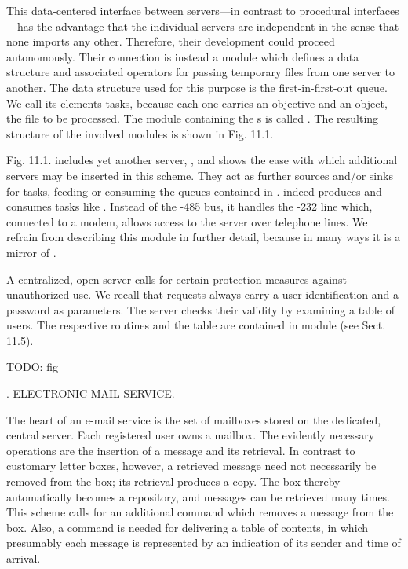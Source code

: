 This data-centered interface between servers---in contrast to procedural inter\-faces---has the advantage that the individual servers are independent in the sense that none imports any other. Therefore, their development could proceed autonomously. Their connection is instead a module which defines a data structure and associated operators for passing temporary files from one server to another. The data structure used for this purpose is the first-in-first-out queue. We call its elements tasks, because each one carries an objective and an object, the file to be processed. The module containing the s is called . The resulting structure of the involved modules is shown in Fig. 11.1.

Fig. 11.1. includes yet another server, , and shows the ease with which additional servers may be inserted in this scheme. They act as further sources and/or sinks for tasks, feeding or consuming the queues contained in .  indeed produces and consumes tasks like . Instead of the -485 bus, it handles the -232 line which, connected to a modem, allows access to the server over telephone lines. We refrain from describing this module in further detail, because in many ways it is a mirror of .

A centralized, open server calls for certain protection measures against unauthorized use. We recall that requests always carry a user identification and a password as parameters. The server checks their validity by examining a table of users. The respective routines and the table are contained in module  (see Sect. 11.5).

TODO: fig

. ELECTRONIC MAIL SERVICE.

The heart of an e-mail service is the set of mailboxes stored on the dedicated, central server. Each registered user owns a mailbox. The evidently necessary operations are the insertion of a message and its retrieval. In contrast to customary letter boxes, however, a retrieved message need not necessarily be removed from the box; its retrieval produces a copy. The box thereby automatically becomes a repository, and messages can be retrieved many times. This scheme calls for an additional command which removes a message from the box. Also, a command is needed for delivering a table of contents, in which presumably each message is represented by an indication of its sender and time of arrival.


